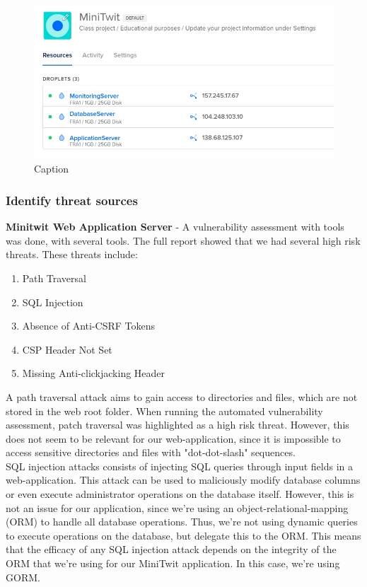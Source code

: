 \begin{figure}[H]
    \centering
    \includegraphics[scale=.5]{images/digitalocean_droplets.jpg}
    \caption{Caption}
    \label{fig:digitalocean_droplets}
\end{figure}

\subsubsection{Identify threat sources}\label{sec:Identify_threat_sources_subsection}
\textbf{Minitwit Web Application Server} - A vulnerability assessment with tools was done, with several tools. The full report\cite{security_assesment_report} showed that we had several high risk threats. These threats include: 

\begin{enumerate}
    \item Path Traversal
    \item SQL Injection
    \item Absence of Anti-CSRF Tokens
    \item CSP Header Not Set
    \item Missing Anti-clickjacking Header
\end{enumerate}

A path traversal attack aims to gain access to directories and files, which are not stored in the web root folder\cite{owasp_path_traversal}. When running the automated vulnerability assessment, patch traversal was highlighted as a high risk threat. However, this does not seem to be relevant for our web-application, since it is impossible to access sensitive directories and files with "dot-dot-slash" sequences.\\


SQL injection attacks consists of injecting SQL queries through input fields in a web-application\cite{owasp_sql_injection}. This attack can be used to maliciously modify database columns or even execute administrator operations on the database itself. However, this is not an issue for our application, since we're using an object-relational-mapping (ORM) to handle all database operations. Thus, we're not using dynamic queries to execute operations on the database, but delegate this to the ORM. This means that the efficacy of any SQL injection attack depends on the integrity of the ORM that we're using for our MiniTwit application. In this case, we're using GORM.\cite{gorm}\\


